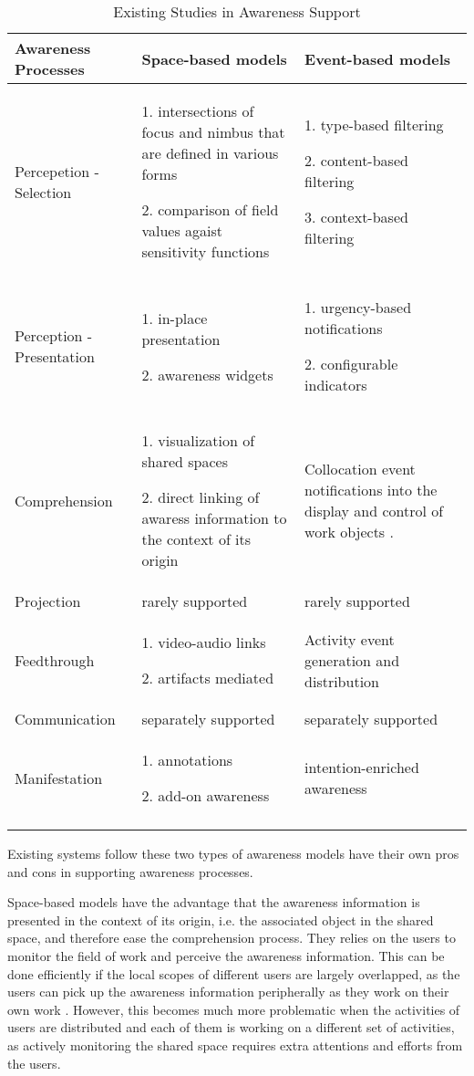 {\footnotesize
\begin{longtable}{>{\raggedright}p{1.1in}>{\raggedright}p{2.2in}>{\raggedright}p{2.2in}}
\toprule 
\textbf{Awareness Processes} & \textbf{Space-based models} & \textbf{Event-based models}\tabularnewline
\midrule 
Percepetion - Selection & 1. intersections of focus and nimbus that are defined in various forms
\cite{Rodden1996,Sandor1997,Benford1993}

2. comparison of field values agaist sensitivity functions \cite{simone2002a} & 1. type-based filtering \cite{Fuchs1995}

2. content-based filtering \cite{Fitzpatrick2002}

3. context-based filtering \cite{Gross2004}\tabularnewline
\midrule 
Perception - Presentation & 1. in-place presentation \cite{Berlage1999}

2. awareness widgets \cite{Gutwin1996,Erickson1999} & 1. urgency-based notifications \cite{Fuchs1995,sohlenkamp2000po}

2. configurable indicators \cite{prinz1999a}\tabularnewline
\midrule 
Comprehension & 1. visualization of shared spaces

2. direct linking of awaress information to the context of its origin & Collocation event notifications into the display and control of work
objects \cite{prinz1999a,carroll2003a}.\tabularnewline
\midrule 
Projection & rarely supported & rarely supported\tabularnewline
\midrule 
Feedthrough & 1. video-audio links \cite{Dourish1992}

2. artifacts mediated \cite{Tee2009} & Activity event generation and distribution \cite{Fuchs1995}\tabularnewline
\midrule 
Communication & separately supported & separately supported\tabularnewline
\midrule 
Manifestation & 1. annotations \cite{Zheng2006,Weng2004}

2. add-on awareness \cite{simone2002a} & intention-enriched awareness \cite{Rittenbruch2007}\tabularnewline
\bottomrule
\caption{Existing Studies in Awareness Support}
\label{tab:existing_studies}

\end{longtable}
}

Existing systems follow these two types of awareness models have their own pros and cons in supporting awareness processes. 

Space-based models have the advantage that the awareness information is presented in the context of its origin, i.e. the associated object in the shared space, and therefore ease the comprehension process. They relies on the users to monitor the field of work and perceive the awareness information. This can be done efficiently if the local scopes of different users are largely overlapped, as the users can pick up the awareness information peripherally as they work on their own work \cite{schmidt2002a}. However, this becomes much more problematic when the activities of users are distributed and each of them is working on a different set of activities, as actively monitoring the shared space requires extra attentions and efforts from the users. 

